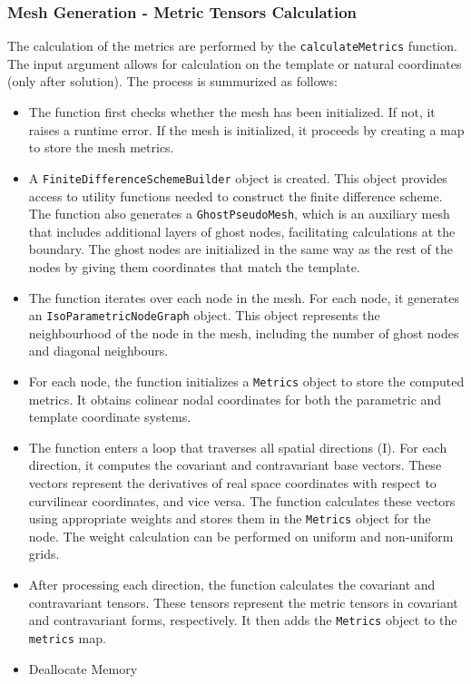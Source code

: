 \documentclass{article}
\begin{document}
	\subsubsection{Mesh Generation - Metric Tensors Calculation}
	The calculation of the metrics are performed by the \texttt{calculateMetrics} function. The input argument allows for calculation on the template or natural coordinates (only after solution). The process is summurized as follows:
	\begin{itemize}
		\item The function first checks whether the mesh has been initialized. If not, it raises a runtime error. If the mesh is initialized, it proceeds by creating a map to store the mesh metrics.
		
		\item A \texttt{FiniteDifferenceSchemeBuilder} object is created. This object provides access to utility functions needed to construct the finite difference scheme. The function also generates a \texttt{GhostPseudoMesh}, which is an auxiliary mesh that includes additional layers of ghost nodes, facilitating calculations at the boundary. The ghost nodes are initialized in the same way as the rest of the nodes by giving them coordinates that match the template.
		
		\item The function iterates over each node in the mesh. For each node, it generates an \newline \texttt{IsoParametricNodeGraph} object. This object represents the neighbourhood of the node in the mesh, including the number of ghost nodes and diagonal neighbours. 
		
		\item For each node, the function initializes a \texttt{Metrics} object to store the computed metrics. It obtains colinear nodal coordinates for both the parametric and template coordinate systems.
		
		\item The function enters a loop that traverses all spatial directions (I). For each direction, it computes the covariant and contravariant base vectors. These vectors represent the derivatives of real space coordinates with respect to curvilinear coordinates, and vice versa. The function calculates these vectors using appropriate weights and stores them in the \texttt{Metrics} object for the node. The weight calculation can be performed on uniform and non-uniform grids.
		
		\item After processing each direction, the function calculates the covariant and contravariant tensors. These tensors represent the metric tensors in covariant and contravariant forms, respectively. It then adds the \texttt{Metrics} object to the \texttt{metrics} map.
		
		\item Deallocate Memory
	\end{itemize}
\end{document}
